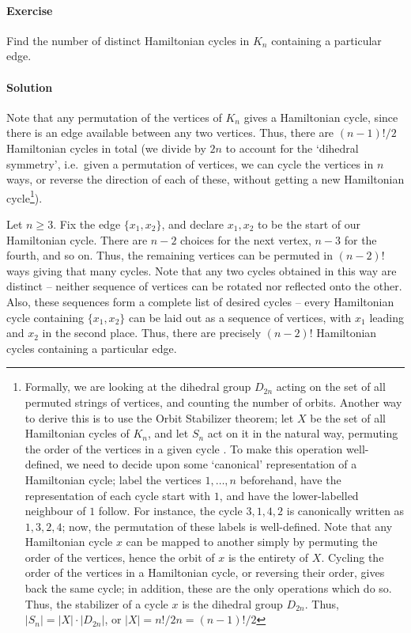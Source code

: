 \documentclass[10pt]{article}
\newcounter{prob}
\newcommand{\problem}{\stepcounter{prob}\paragraph{Exercise \arabic{prob}}}
\newcommand{\solution}{\paragraph{Solution}}
\begin{document}
    \problem Find the number of distinct Hamiltonian cycles in $K_n$ containing a
    particular edge.

    \solution Note that any permutation of the vertices of $K_n$ gives a Hamiltonian
    cycle, since there is an edge available between any two vertices. Thus, there are
    $(n - 1)! / 2$ Hamiltonian cycles in total (we divide by $2n$ to account for the
    `dihedral symmetry', i.e.\ given a permutation of vertices, we can cycle the
    vertices in $n$ ways, or reverse the direction of each of these, without getting
    a new Hamiltonian cycle\footnote{Formally, we are looking at the dihedral group
    $D_{2n}$ acting on the set of all permuted strings of vertices, and counting the
    number of orbits. Another way to derive this is to use the Orbit Stabilizer
    theorem; let $X$ be the set of all Hamiltonian cycles of $K_n$, and let $S_n$ act
    on it in the natural way, permuting the order of the vertices in a given cycle .
    To make this operation well-defined, we need to decide upon some `canonical'
    representation of a Hamiltonian cycle; label the vertices $1, \dots, n$
    beforehand, have the representation of each cycle start with $1$, and have the
    lower-labelled neighbour of $1$ follow. For instance, the cycle $3,1,4,2$ is
    canonically written as $1,3,2,4$; now, the permutation of these labels is
    well-defined. Note that any Hamiltonian cycle $x$ can be mapped to another simply
    by permuting  the order of the vertices, hence the orbit of $x$ is the entirety
    of $X$.  Cycling the order of the vertices in a Hamiltonian cycle, or reversing
    their order, gives back the same cycle; in addition, these are the only
    operations which do so. Thus, the stabilizer of a cycle $x$ is the dihedral group
    $D_{2n}$. Thus, $|S_n| = |X|\cdot |D_{2n}|$, or $|X| = n! / 2n = (n - 1)! /
    2$}).
    
    Let $n \geq 3$. Fix the edge $\{x_1, x_2\}$, and declare $x_1, x_2$ to be the
    start of our Hamiltonian cycle. There are $n - 2$ choices for the next vertex, $n
    - 3$ for the fourth, and so on. Thus, the remaining vertices can be permuted in
    $(n - 2)!$ ways giving that many cycles. Note that any two cycles obtained in
    this way are distinct -- neither sequence of vertices can be rotated nor
    reflected onto the other. Also, these sequences form a complete list of desired
    cycles -- every Hamiltonian cycle containing $\{x_1, x_2\}$ can be laid out as a
    sequence of vertices, with $x_1$ leading and $x_2$ in the second place.  Thus,
    there are precisely $(n - 2)!$ Hamiltonian cycles containing a particular edge.
\end{document}
